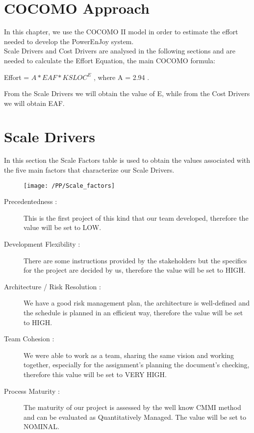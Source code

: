 \section{COCOMO Approach}
In this chapter, we use the COCOMO II model in order to estimate the effort needed to develop the PowerEnJoy system. 
\\Scale Drivers and Cost Drivers are analysed in the following sections and are needed to calculate the Effort Equation, the main COCOMO formula:
\\\begin{center} Effort = $A * EAF * KSLOC^E$  , where A = 2.94 . \end{center}
From the Scale Drivers we will obtain the value of E, while from the Cost Drivers we will obtain EAF. 

\newpage
\section{Scale Drivers}
In this section the Scale Factors table is used to obtain the values associated with the five main factors that characterize our Scale Drivers. %
\begin{center}
\begin{figure}[!ht]
  \centering
  \vspace{0.2cm}
  \texttt{[image: /PP/Scale\_factors]}\\
  \vspace{0.1cm}
  \label{fig:scale_factors} 
\end{figure}
\end{center}

\begin{description}
    \item [Precedentedness :] This is the first project of this kind that our team developed, therefore the value will be set to LOW.
    \item [Development Flexibility :] There are some instructions provided by the stakeholders but the specifics for the project are decided by us, therefore the value will be set to HIGH.
    \item [Architecture / Risk Resolution :] We have a good risk management plan, the architecture is well-defined and the schedule is planned in an efficient way, therefore the value will be set to HIGH. 
    \item [Team Cohesion :] We were able to work as a team, sharing the same vision and working together, especially for the assignment's planning the document's checking, therefore this value will be set to VERY HIGH.
    \item [Process Maturity :] The maturity of our project is assessed by the well know CMMI method and can be evaluated as Quantitatively Managed. The value will be set to NOMINAL. 
\end{description}

